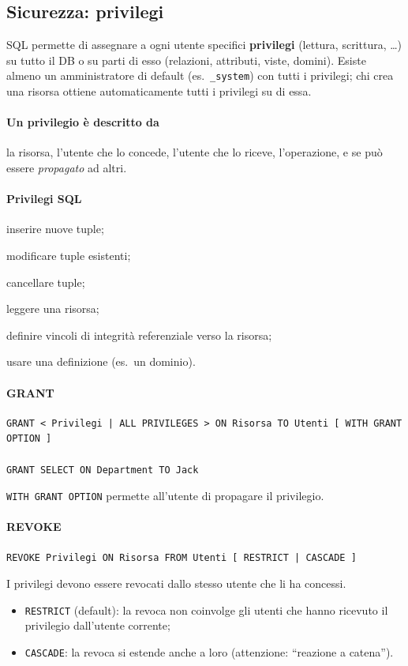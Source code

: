 \documentclass[a4paper,12pt]{article}
\begin{document}
\subsection{Sicurezza: privilegi}

SQL permette di assegnare a ogni utente specifici \textbf{privilegi} (lettura,
scrittura, \dots) su tutto il DB o su parti di esso (relazioni, attributi,
viste, domini). Esiste almeno un amministratore di default (es.\
\texttt{\_system}) con tutti i privilegi; chi crea una risorsa ottiene
automaticamente tutti i privilegi su di essa.

\paragraph{Un privilegio è descritto da} la risorsa, l'utente che lo concede,
l'utente che lo riceve, l'operazione, e se può essere \emph{propagato} ad altri.

\paragraph{Privilegi SQL}
\begin{description}[style=nextline]
  \item[insert] inserire nuove tuple;
  \item[update] modificare tuple esistenti;
  \item[delete] cancellare tuple;
  \item[select] leggere una risorsa;
  \item[references] definire vincoli di integrità referenziale verso la
    risorsa;
  \item[usage] usare una definizione (es.\ un dominio).
\end{description}

\paragraph{GRANT}
\begin{verbatim}
GRANT < Privilegi | ALL PRIVILEGES > ON Risorsa TO Utenti [ WITH GRANT OPTION ]

GRANT SELECT ON Department TO Jack
\end{verbatim}
\texttt{WITH GRANT OPTION} permette all'utente di propagare il privilegio.

\paragraph{REVOKE}
\begin{verbatim}
REVOKE Privilegi ON Risorsa FROM Utenti [ RESTRICT | CASCADE ]
\end{verbatim}
I privilegi devono essere revocati dallo stesso utente che li ha concessi.
\begin{itemize}
  \item \texttt{RESTRICT} (default): la revoca non coinvolge gli utenti che
    hanno ricevuto il privilegio dall'utente corrente;
  \item \texttt{CASCADE}: la revoca si estende anche a loro (attenzione:
    ``reazione a catena'').
\end{itemize}
\end{document}
